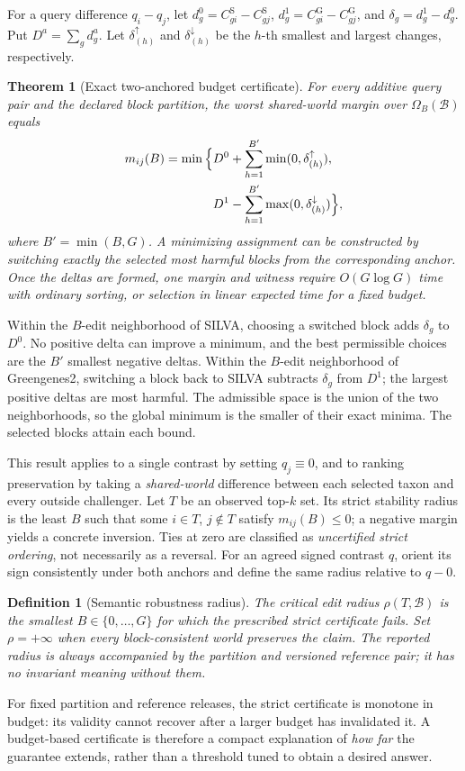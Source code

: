 \documentclass[conference]{IEEEtran}
\newtheorem{theorem}{Theorem}
\newtheorem{definition}{Definition}
\newcommand{\OO}{\mathcal{\Omega}}
\newcommand{\B}{\mathcal{B}}
\newcommand{\Sref}{\mathrm{S}}
\newcommand{\Gref}{\mathrm{G}}
\begin{document}
For a query difference $q_i-q_j$, let $d_g^0=C_{gi}^{\Sref}-C_{gj}^{\Sref}$, $d_g^1=C_{gi}^{\Gref}-C_{gj}^{\Gref}$, and $\delta_g=d_g^1-d_g^0$. Put $D^a=\sum_g d_g^a$. Let $\delta_{(h)}^{\uparrow}$ and $\delta_{(h)}^{\downarrow}$ be the $h$-th smallest and largest changes, respectively.
\begin{theorem}[Exact two-anchored budget certificate]
For every additive query pair and the declared block partition, the worst shared-world margin over $\OO_B(\B)$ equals
\begin{align}
 m_{ij}(B)=\min\Big\{&D^0+\sum_{h=1}^{B'}\min(0,\delta_{(h)}^{\uparrow}),\notag\\
 &D^1-\sum_{h=1}^{B'}\max(0,\delta_{(h)}^{\downarrow})\Big\},
 \label{eq:budgetmargin}
\end{align}
where $B'=\min(B,G)$. A minimizing assignment can be constructed by switching exactly the selected most harmful blocks from the corresponding anchor. Once the deltas are formed, one margin and witness require $O(G\log G)$ time with ordinary sorting, or selection in linear expected time for a fixed budget.
\end{theorem}
\begin{IEEEproof}
Within the $B$-edit neighborhood of SILVA, choosing a switched block adds $\delta_g$ to $D^0$. No positive delta can improve a minimum, and the best permissible choices are the $B'$ smallest negative deltas. Within the $B$-edit neighborhood of Greengenes2, switching a block back to SILVA subtracts $\delta_g$ from $D^1$; the largest positive deltas are most harmful. The admissible space is the union of the two neighborhoods, so the global minimum is the smaller of their exact minima. The selected blocks attain each bound.
\end{IEEEproof}

This result applies to a single contrast by setting $q_j\equiv 0$, and to ranking preservation by taking a \emph{shared-world} difference between each selected taxon and every outside challenger. Let $T$ be an observed top-$k$ set. Its strict stability radius is the least $B$ such that some $i\in T$, $j\notin T$ satisfy $m_{ij}(B)\le0$; a negative margin yields a concrete inversion. Ties at zero are classified as \emph{uncertified strict ordering}, not necessarily as a reversal. For an agreed signed contrast $q$, orient its sign consistently under both anchors and define the same radius relative to $q-0$.
\begin{definition}[Semantic robustness radius]
The \emph{critical edit radius} $\rho(T,\B)$ is the smallest $B\in\{0,\ldots,G\}$ for which the prescribed strict certificate fails. Set $\rho=+\infty$ when every block-consistent world preserves the claim. The reported radius is always accompanied by the partition and versioned reference pair; it has no invariant meaning without them.
\end{definition}
For fixed partition and reference releases, the strict certificate is monotone in budget: its validity cannot recover after a larger budget has invalidated it. A budget-based certificate is therefore a compact explanation of \emph{how far} the guarantee extends, rather than a threshold tuned to obtain a desired answer.
\end{document}
